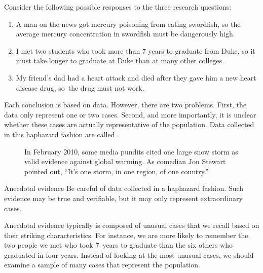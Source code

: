 
\noindent%
Consider the following possible responses to the three research questions:
\begin{enumerate}
\setlength{\itemsep}{0mm}
\item
    A man on the news got mercury poisoning from eating swordfish,
    so the average mercury concentration in swordfish must be
    dangerously high.
\item\label{iKnowThreeStudentsWhoTookMoreThan7YearsToGraduateAtDuke}
    I met two students who took more than 7 years to graduate
    from Duke, so it must take longer to graduate at Duke than
    at many other colleges.
\item\label{myFriendsDadDiedAfterSulphinpyrazon}
    My friend's dad had a heart attack and died after they gave
    him a new heart disease drug, so~the drug must not work.
\end{enumerate}
Each conclusion is based on data.
However, there are two problems.
First, the data only represent one or two cases.
Second, and more importantly, it is unclear whether these cases
are actually representative of the population.
Data collected in this haphazard fashion are called
.

\setlength{\captionwidth}{\textwidth-75mm}
\begin{figure}[h]
  \centering
  \hspace{8mm}\hspace{4mm}
  \begin{minipage}[b]{\textwidth-75mm}
    \caption[anecdotal evidence]{In February 2010,
        some media pundits cited one large snow storm
        as valid evidence against global warming.
        As comedian Jon Stewart pointed out,
        ``It's one storm, in one region, of one country.''
    \label{mnWinter}}
  \end{minipage}
\end{figure}
\setlength{\captionwidth}{\mycaptionwidth}

\begin{onebox}{Anecdotal evidence}
Be careful of data collected in a haphazard fashion.
Such evidence may be true and verifiable, but it may
only represent extraordinary cases.
\end{onebox}

\D{\newpage}

Anecdotal evidence typically is composed of unusual cases that we recall based on their striking characteristics. For instance, we are more likely to remember the two people we met who took 7~years to graduate than the six others who graduated in four years. Instead of looking at the most unusual cases, we should examine a sample of many cases that represent the population.

